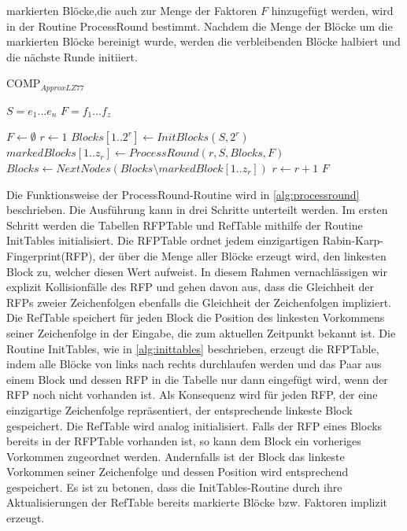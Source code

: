 markierten Blöcke,die auch zur Menge der Faktoren $F$ hinzugefügt werden, wird in der Routine ProcessRound bestimmt. Nachdem die Menge der Blöcke um die markierten Blöcke bereinigt wurde,
werden die verbleibenden Blöcke halbiert und die nächste Runde initiiert.
\begin{algorithm}[ht]
\centering
\caption{COMP$_{ApproxLZ77}$} \label{alg:compapproxlz77}
\algorithmicrequire $S=e_1...e_n$
\algorithmicensure $F=f_1...f_z$
\begin{algorithmic}[1]
    \STATE $F \gets \emptyset$
    \STATE $r \gets 1$
    \STATE $Blocks[1..2^r] \gets InitBlocks(S, 2^r)$ 
        \STATE $markedBlocks[1..z_r] \gets ProcessRound(r, S, Blocks, F)$
        \STATE $Blocks \gets NextNodes(Blocks\setminus markedBlock[1..z_r])$ 
        \STATE $r \gets r+1$
    \ENDWHILE
    \RETURN $F$
\end{algorithmic}
\end{algorithm}

Die Funktionsweise der ProcessRound-Routine wird in \ref{alg:processround} beschrieben. Die Ausführung kann in drei Schritte unterteilt werden. Im ersten Schritt werden die Tabellen RFPTable und RefTable
mithilfe der Routine InitTables initialisiert. Die RFPTable ordnet jedem einzigartigen Rabin-Karp-Fingerprint(RFP), der über die Menge aller Blöcke erzeugt wird, den linkesten Block zu, welcher diesen 
Wert aufweist. In diesem Rahmen vernachlässigen wir explizit Kollisionfälle des RFP und gehen davon aus, dass die Gleichheit der RFPs zweier Zeichenfolgen ebenfalls die Gleichheit der Zeichenfolgen impliziert.
Die RefTable speichert für jeden Block die Position des linkesten Vorkommens seiner Zeichenfolge in der Eingabe, die zum aktuellen Zeitpunkt bekannt ist.
Die Routine InitTables, wie in \ref{alg:inittables} beschrieben, erzeugt die RFPTable, indem alle Blöcke von links nach rechts durchlaufen werden und das Paar aus einem Block und dessen RFP in die Tabelle
nur dann eingefügt wird, wenn der RFP noch nicht vorhanden ist. Als Konsequenz wird für jeden RFP, der eine einzigartige Zeichenfolge repräsentiert, der entsprechende linkeste Block gespeichert. Die RefTable
wird analog initialisiert. Falls der RFP eines Blocks bereits in der RFPTable vorhanden ist, so kann dem Block ein vorheriges Vorkommen zugeordnet werden. Andernfalls ist der Block das linkeste Vorkommen seiner
Zeichenfolge und dessen Position wird entsprechend gespeichert. Es ist zu betonen, dass die InitTables-Routine durch ihre Aktualisierungen der RefTable bereits markierte Blöcke bzw. Faktoren implizit erzeugt.

